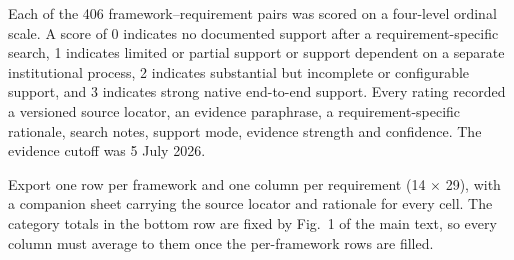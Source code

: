 \documentclass[10pt,a4paper]{article}
\newenvironment{tkbox}[1]{%
  \begin{tcolorbox}[breakable,colback=tkred!4,colframe=tkred,boxrule=0.6pt,
    left=6pt,right=6pt,top=5pt,bottom=5pt,
    title={\footnotesize\bfseries #1},fonttitle=\color{white}]\small}{\end{tcolorbox}}
\begin{document}
Each of the 406 framework--requirement pairs was scored on a four-level ordinal scale.
A score of 0 indicates no documented support after a requirement-specific search, 1
indicates limited or partial support or support dependent on a separate institutional
process, 2 indicates substantial but incomplete or configurable support, and 3
indicates strong native end-to-end support. Every rating recorded a versioned source
locator, an evidence paraphrase, a requirement-specific rationale, search notes,
support mode, evidence strength and confidence. The evidence cutoff was 5 July 2026.

\vspace{4pt}
\begin{tkbox}{This table must be exported from the scoring database, not rebuilt by hand}
Export one row per framework and one column per requirement (14 $\times$ 29), with a
companion sheet carrying the source locator and rationale for every cell. The category totals in
the bottom row are fixed by Fig.~1 of the main text, so every column must
average to them once the per-framework rows are filled.
\end{tkbox}
\end{document}
